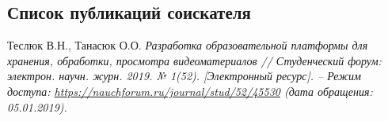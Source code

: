 \subsection*{Список публикаций соискателя}

\begin{thebibliography}{}

\bibitem{}
  Теслюк В.Н., Танасюк О.О.
  \emph{Разработка образовательной платформы для хранения, обработки, просмотра видеоматериалов
  // Студенческий форум: электрон. научн. журн. 2019. № 1(52).
  [Электронный ресурс]. – Режим доступа:
  \href{https://nauchforum.ru/journal/stud/52/45530}{https://nauchforum.ru/journal/stud/52/45530}
  (дата обращения: 05.01.2019).}

\end{thebibliography}{}

\endgroup